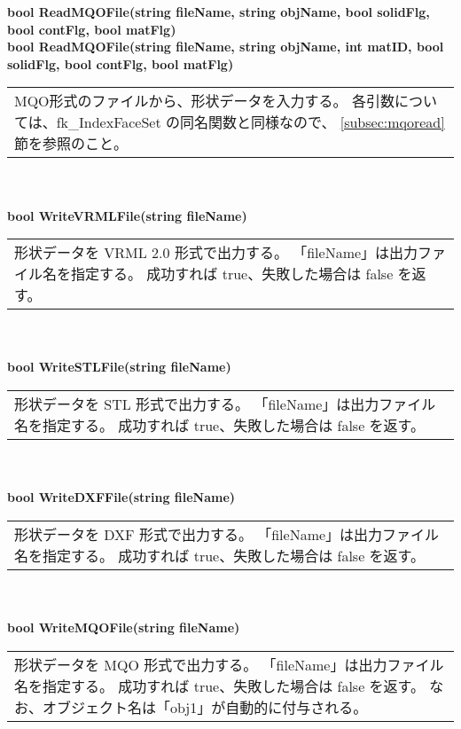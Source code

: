 \begin{tabbing}
\> {\footnotesize \bf bool ReadMQOFile(string fileName,
	string objName, bool solidFlg, bool contFlg, bool matFlg)} \\
\> {\footnotesize \bf bool ReadMQOFile(string fileName,
	string objName, int matID, bool solidFlg, bool contFlg, bool matFlg)} \\
	\> \> \begin{tabular}{p{15cm}}
		MQO形式のファイルから、形状データを入力する。
		各引数については、fk\_IndexFaceSet の同名関数と同様なので、
		\ref{subsec:mqoread}節を参照のこと。
	\end{tabular} \\ \\

\> \textbf{bool WriteVRMLFile(string fileName)} \\
	\> \> \begin{tabular}{p{15cm}}
		形状データを VRML 2.0 形式で出力する。
		「fileName」は出力ファイル名を指定する。
		成功すれば true、失敗した場合は false を返す。
	\end{tabular} \\ \\

\> \textbf{bool WriteSTLFile(string fileName)} \\
	\> \> \begin{tabular}{p{15cm}}
		形状データを STL 形式で出力する。
		「fileName」は出力ファイル名を指定する。
		成功すれば true、失敗した場合は false を返す。
	\end{tabular} \\ \\

\> \textbf{bool WriteDXFFile(string fileName)} \\
	\> \> \begin{tabular}{p{15cm}}
		形状データを DXF 形式で出力する。
		「fileName」は出力ファイル名を指定する。
		成功すれば true、失敗した場合は false を返す。
	\end{tabular} \\ \\

\> \textbf{bool WriteMQOFile(string fileName)} \\
	\> \> \begin{tabular}{p{15cm}}
		形状データを MQO 形式で出力する。
		「fileName」は出力ファイル名を指定する。
		成功すれば true、失敗した場合は false を返す。
		なお、オブジェクト名は「obj1」が自動的に付与される。		
	\end{tabular}
\end{tabbing}
